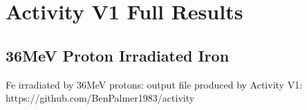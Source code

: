 \chapter{Activity V1 Full Results}
\label{chapter:appendix-activity-v1}

\section{36MeV Proton Irradiated Iron}

Fe irradiated by 36MeV protons: output file produced by Activity V1: https://github.com/BenPalmer1983/activity







